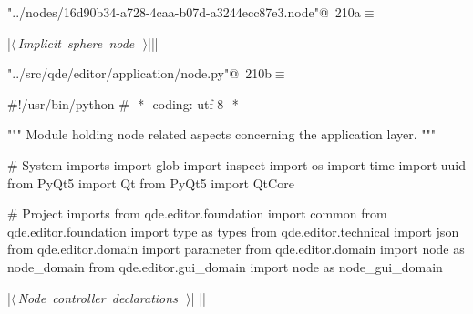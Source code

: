 \documentclass[%
    a4paper,    %
    justified,  %
    nobib,      %
    openany     %
]{tufte-book}
\makeatletter
\renewcommand{\label}[1]{\@tufte@label{##1}}%
\makeatother
\begin{document}
\begin{fullwidth}
\begin{flushleft}
\begin{minipage}{\linewidth}
\begin{list}{}{\setlength{\itemsep}{-\parsep}\setlength{\itemindent}{-\leftmargin}}
\item{}
\end{list}
\end{minipage}\vspace{4ex}
\end{flushleft}
\begin{flushleft} \small
\begin{minipage}{\linewidth}\label{scrap208}\raggedright\small
{} \verb@"../nodes/16d90b34-a728-4caa-b07d-a3244ecc87e3.node"@\nobreak\ {\footnotesize {210a}}$\equiv$
\vspace{-1ex}
\begin{pythoncode}
|\hbox{$\langle\,${\itshape Implicit sphere node}\nobreak\ {\footnotesize {}}$\,\rangle$}||\NWsep|
\end{pythoncode}
\vspace{1.5ex}
\footnotesize
\begin{list}{}{\setlength{\itemsep}{-\parsep}\setlength{\itemindent}{-\leftmargin}}

\item{}
\end{list}
\end{minipage}\vspace{4ex}
\end{flushleft}
\begin{flushleft} \small
\begin{minipage}{\linewidth}\label{scrap209}\raggedright\small
{} \verb@"../src/qde/editor/application/node.py"@\nobreak\ {\footnotesize {210b}}$\equiv$
\vspace{-1ex}
\begin{pythoncode}
#!/usr/bin/python
# -*- coding: utf-8 -*-

""" Module holding node related aspects concerning the application layer.
"""

# System imports
import glob
import inspect
import os
import time
import uuid
from PyQt5 import Qt
from PyQt5 import QtCore

# Project imports
from qde.editor.foundation import common
from qde.editor.foundation import type as types
from qde.editor.technical  import json
from qde.editor.domain     import parameter
from qde.editor.domain     import node as node_domain
from qde.editor.gui_domain import node as node_gui_domain


|\hbox{$\langle\,${\itshape Node controller declarations}\nobreak\ {\footnotesize {}}$\,\rangle$}|
|\NWsep|
\end{pythoncode}
\vspace{1.5ex}
\footnotesize
\begin{list}{}{\setlength{\itemsep}{-\parsep}\setlength{\itemindent}{-\leftmargin}}


\end{list}
\end{minipage}
\end{flushleft}
\end{fullwidth}
\end{document}

